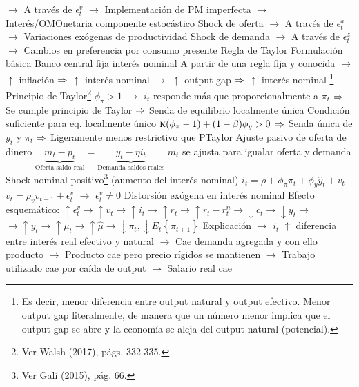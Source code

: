 \documentclass{nuevotema}
\begin{document}
\begin{esquemal}
				\4[] $\to$ A través de $\epsilon_t^v$
				\4[] $\to$ Implementación de PM imperfecta
				\4[] $\to$ Interés/OMOnetaria componente estocástico
				\4[] Shock de oferta
				\4[] $\to$ A través de $\epsilon_t^a$
				\4[] $\to$ Variaciones exógenas de productividad
				\4[] Shock de demanda
				\4[] $\to$ A través de $\epsilon_t^z$
				\4[] $\to$ Cambios en preferencia por consumo presente
			\3 Regla de Taylor
				\4 Formulación básica
				\4[] 
				\4 Banco central fija interés nominal
				\4[] A partir de una regla fija y conocida
				\4[] $\to$ $\uparrow$ inflación $\Rightarrow$ $\uparrow$ interés nominal
				\4[] $\to$ $\uparrow$ output-gap $\Rightarrow$ $\uparrow$ interés nominal \footnote{Es decir, menor diferencia entre output natural y output efectivo. Menor output gap literalmente, de manera que un número menor implica que el output gap se abre y la economía se aleja del output natural (potencial).}
				\4 Principio de Taylor\footnote{Ver Walsh (2017), págs. 332-335.}
				\4[] $\phi_\pi > 1$
				\4[] $\to$ $i_t$ responde más que proporcionalmente a $\pi_t$
				\4[] $\Rightarrow$ Se cumple principio de Taylor
				\4[] $\Rightarrow$ Senda de equilibrio localmente única
				\4 Condición suficiente para eq. localmente único
				\4[] $\textsc{k}(\phi_\pi - 1 ) + (1-\beta) \phi_y > 0$
				\4[] $\Rightarrow$ Senda única de $y_t$ y $\pi_t$
				\4[] $\Rightarrow$ Ligeramente menos restrictivo que PTaylor
				\4 Ajuste pasivo de oferta de dinero
				\4[] $\underbrace{m_t - p_t}_{\text{Oferta saldo real}} = \underbrace{y_t - \eta i_t}_\text{Demanda saldos reales}$
				\4[] $m_t$ se ajusta para igualar oferta y demanda
				\4 Shock nominal positivo\footnote{Ver Galí (2015), pág. 66.}
				\4[] (aumento del interés nominal)
				\4[] $i_t = \rho + \phi_\pi \pi_t + \phi_y \hat{y}_t + v_t $
				\4[] $v_t=\rho_v v_{t-1} + \epsilon_t^v$
				\4[] $\to$ $\epsilon_t^v \neq 0$
				\4[] Distorsión exógena en interés nominal
				\4[] Efecto esquemático:
				\4[] $\uparrow \epsilon_t^v \to \uparrow v_t \to \uparrow i_t \to \uparrow r_t \to \uparrow r_t - r_t^n \to \downarrow c_t \to \downarrow y_t \to$
				\4[] $\to \uparrow y_t \to \uparrow \mu_t \to \uparrow \hat{\mu} \to \downarrow \pi_t, \downarrow E_t \left\lbrace \pi_{t+1} \right\rbrace$
				\4[] Explicación
				\4[] $\to$ $i_t$ $\uparrow$ diferencia entre interés real efectivo y natural
				\4[] $\to$ Cae demanda agregada y con ello producto
				\4[] $\to$ Producto cae pero precio rígidos se mantienen
				\4[] $\to$ Trabajo utilizado cae por caída de output
				\4[] $\to$ Salario real cae

\end{esquemal}
\end{document}
